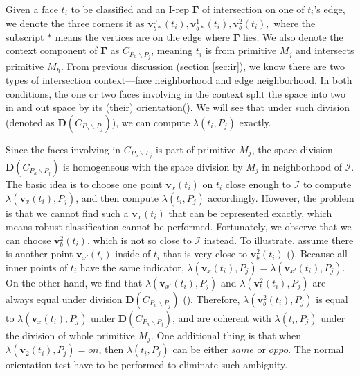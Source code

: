 \documentclass[10pt,journal,compsoc]{IEEEtran}
\begin{document}
Given a face $t_i$ to be classified and an I-rep $\boldsymbol\Gamma$ of intersection on one of $t_i$'s edge, we denote the three corners it as $\bm{v}_{b*}^{0}(t_i), \bm{v}_{b*}^{1}(t_i), \bm{v}_b^2(t_i),$ where the subscript $*$ means the vertices are on the edge where $\boldsymbol\Gamma$ lies. We also denote the context component of $\boldsymbol\Gamma$ as $C_{P_h \backslash P_j}$, meaning $t_i$ is from primitive $M_j$ and intersects primitive $M_h$. From previous discussion (section \ref{sec:ir}){\color{red}{may be more than one}}, we know there are two types of intersection context---face neighborhood and edge neighborhood. In both conditions, the one or two faces involving in the context split the space into two in and out space by its (their) orientation(). We will see that under such division (denoted as $\boldsymbol{D}(C_{P_h \backslash P_j})$), we can compute $\lambda(t_i, P_j)$ exactly.

Since the faces involving in $C_{P_h \backslash P_j}$ is part of primitive $M_j$, the space division $\boldsymbol{D}(C_{P_h \backslash P_j})$ is homogeneous with the space division by $M_j$ in neighborhood of $\bm{\mathcal{I}}$. The basic idea is to choose one point $\bm{v}_x(t_i)$ on $t_i$ close enough to $\bm{\mathcal{I}}$ to compute $\lambda(\bm{v}_x(t_i), P_j)$, and then compute $\lambda(t_i, P_j)$ accordingly. However, the problem is that we cannot find such a $\bm{v}_x(t_i)$ that can be represented exactly, which means robust classification cannot be performed. Fortunately, we observe that we can choose $\bm{v}_b^2(t_i)$, which is not so close to $\bm{\mathcal{I}}$ instead. To illustrate, assume there is another point $\bm{v}_{x'}(t_i)$ inside of $t_i$ that is very close to $\bm{v}_b^2(t_i)$ ({\color{red}{Fig. x}}). Because all inner points of $t_i$ have the same indicator, $\lambda(\bm{v}_x(t_i), P_j) = \lambda(\bm{v}_{x'}(t_i), P_j)$. On the other hand, we find that $\lambda(\bm{v}_{x'}(t_i), P_j)$ and $\lambda(\bm{v}_b^2(t_i), P_j)$ are always equal under division $\boldsymbol{D}(C_{P_h \backslash P_j})$ ({}). Therefore, $\lambda(\bm{v}_b^2(t_i), P_j)$ is equal to $\lambda(\bm{v}_x(t_i), P_j)$ under $\boldsymbol{D}(C_{P_h \backslash P_j})$, and are coherent with $\lambda(t_i, P_j)$ under the division of whole primitive $M_j$. One additional thing is that when $\lambda(\bm{v}_2(t_i), P_j)=on$, then $\lambda(t_i, P_j)$ can be either $same$ or $oppo$. The normal orientation test have to be performed to eliminate such ambiguity.
\end{document}
